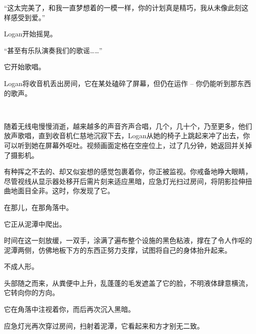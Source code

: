 \begin{scpdialog}
“这太完美了，和我一直梦想着的一模一样，你的计划真是精巧，我从未像此刻这样感受到爱。”
\end{scpdialog}

\begin{scpbox}
Logan开始摇晃。
\end{scpbox}

\begin{scpdialog}
“甚至有乐队演奏我们的歌谣……”
\end{scpdialog}

\begin{scpbox}
它开始歌唱。
\end{scpbox}

\begin{scpdialog}

\end{scpdialog}

\begin{scpdialog}
Logan将收音机丢出房间，它在某处磕碎了屏幕，但仍在运作 – 你仍能听到那东西的歌声。
\end{scpdialog}

\begin{scpdialog}
\\
\end{scpdialog}

\begin{scpbox}
随着无线电慢慢消逝，越来越多的声音齐声合唱，几个，几十个，乃至更多，他们放声歌唱，直到收音机仁慈地沉寂下去，Logan从她的椅子上跳起来冲了出去，你可以听到她在屏幕外呕吐。视频画面定格在空座位上，过了几分钟，她返回并关掉了摄影机。
\end{scpbox}

\hr


\newpage



\begin{scpbox}

有种挥之不去的、却又似妄想的感觉包裹着你，你正被监视。你戒备地睁大眼睛，尽管视线从显示器处移开后需片刻来适应黑暗，应急灯光扫过房间，将阴影拉伸扭曲地面目全非。这时，你发现了它。

在那儿，在那角落中。

它正从泥潭中爬出。

时间在这一刻放缓，一双手，涂满了遍布整个设施的黑色粘液，撑在了令人作呕的泥潭两侧，仿佛地板下方的东西正努力支撑，试图将自己的身体抬升起来。

不成人形。

头部随之而来，从粪便中上升，乱蓬蓬的毛发遮盖了它的脸，不明液体肆意横流，它转向你的方向。

它在角落中注视着你，而后再次沉入黑暗。

应急灯光再次穿过房间，扫射着泥潭，它看起来和方才别无二致。

\end{scpbox}

